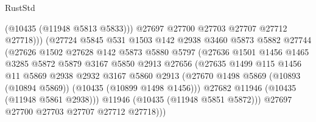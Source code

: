 \begin{lexlean}{RustStd}
\begin{coremodule}
                                    (@10435 (@11948 @5813 @5833)))
                                  @27697
                                  @27700
                                  @27703
                                  @27707
                                  @27712
                                  @27718)))
                            (@27724
                              @5845
                              @531
                              @1503
                              @142
                              @2938
                              @3460
                              @5873
                              @5882
                              @27744
                              (@27626
                                @1502
                                @27628
                                @142
                                @5873
                                @5880
                                @5797
                                (@27636
                                  @1501
                                  @1456
                                  @1465
                                  @3285
                                  @5872
                                  @5879
                                  @3167
                                  @5850
                                  @2913
                                  @27656
                                  (@27635
                                    @1499
                                    @115
                                    @1456
                                    @11
                                    @5869
                                    @2938
                                    @2932
                                    @3167
                                    @5860
                                    @2913
                                    (@27670
                                      @1498
                                      @5869
                                      (@10893 (@10894 @5869))
                                      (@10435 (@10899 @1498 @1456)))
                                    @27682
                                    @11946
                                    (@10435 (@11948 @5861 @2938)))
                                  @11946
                                  (@10435 (@11948 @5851 @5872)))
                                @27697
                                @27700
                                @27703
                                @27707
                                @27712
                                @27718)))

\end{coremodule}
\end{lexlean}
